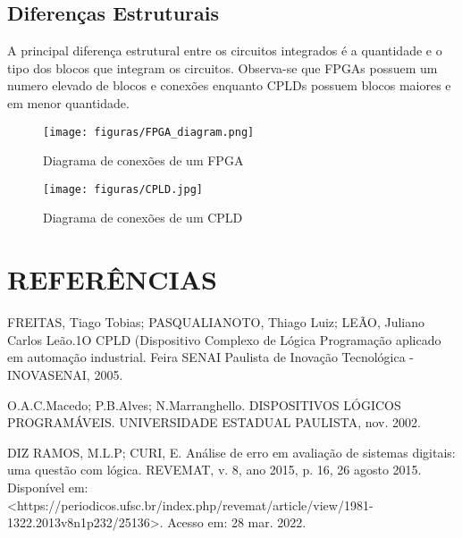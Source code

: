 \subsection{\esp Diferenças Estruturais}
A principal diferença estrutural entre os circuitos integrados é a quantidade e o tipo dos blocos que integram os circuitos. Observa-se que FPGAs possuem um numero elevado de blocos e conexões enquanto CPLDs possuem blocos maiores e em menor quantidade.



\begin{figure}[ht]
\centering
\texttt{[image: figuras/FPGA\_diagram.png]}
\caption{Diagrama de conexões de um FPGA}
\label{fig:exampleFig2}
\end{figure}


\begin{figure}[ht]
\centering
\texttt{[image: figuras/CPLD.jpg]}
\caption{Diagrama de conexões de um CPLD}
\label{fig:exampleFig2}
\end{figure}
   
\section{REFERÊNCIAS}

FREITAS, Tiago Tobias; PASQUALIANOTO, Thiago Luiz; LEÃO, Juliano Carlos Leão.1O CPLD (Dispositivo Complexo de Lógica Programação aplicado em automação industrial. Feira SENAI Paulista de Inovação Tecnológica  -  INOVASENAI, 2005.

O.A.C.Macedo; P.B.Alves;  N.Marranghello. DISPOSITIVOS LÓGICOS PROGRAMÁVEIS. UNIVERSIDADE ESTADUAL PAULISTA, nov. 2002.

DIZ RAMOS, M.L.P; CURI, E. Análise de erro em avaliação de sistemas digitais: uma questão com lógica. REVEMAT, v. 8, ano 2015, p. 16, 26 agosto 2015. Disponível em: <https://periodicos.ufsc.br/index.php/revemat/article/view/1981-1322.2013v8n1p232/25136>. Acesso em: 28 mar. 2022.
 


